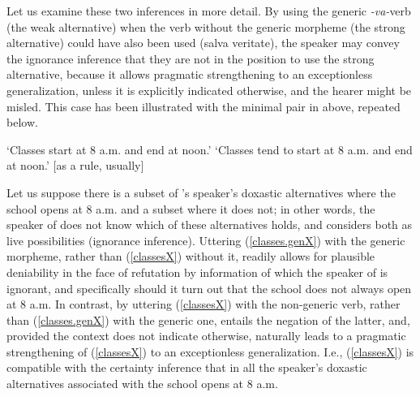 \documentclass[output=paper,colorlinks,citecolor=brown]{langscibook}
\begin{document}
Let us examine these two inferences in more detail.
By using the generic \textit{-va-}verb (the weak alternative) when the verb without the generic morpheme
(the strong alternative) could have also been used (salva veritate), the speaker
may convey the ignorance inference that they are not in the position to use the strong alternative, because it allows
pragmatic strengthening to an exceptionless
generalization, unless it is explicitly indicated otherwise,
and the hearer might be misled.
This case has been illustrated with the minimal pair in  above, repeated below.

\ea\label{classesX-toplevel}
\glt `Classes start at 8 a.m. and end at noon.'
\glt `Classes tend to start at 8 a.m. and end at noon.' [as a rule, usually]
\z
\z

\noindent Let us suppose there is a subset of 's speaker's doxastic alternatives where the school opens at 8 a.m. and a subset where it does not; in other words, the speaker of  does not know which of these alternatives holds, and considers both as live possibilities
(ignorance inference). Uttering (\ref{classes.genX})
with the generic morpheme, rather than (\ref{classesX}) without it, readily allows for plausible deniability in the face of refutation by information of which the speaker of  is ignorant,
and specifically should it turn out that the school does not always open at 8 a.m.
In contrast, by uttering (\ref{classesX}) with
the non-generic verb,
rather than (\ref{classes.genX}) with the generic one,  entails the negation of the latter, and,
provided the context
does not indicate otherwise, naturally leads to a pragmatic strengthening of (\ref{classesX}) to an exceptionless generalization. I.e.,
(\ref{classesX}) is compatible with the certainty inference that
in all the speaker's doxastic alternatives associated with  the school opens at 8 a.m.
\end{document}
